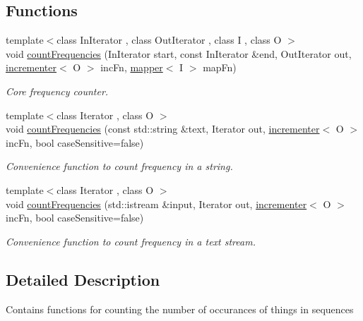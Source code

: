 \subsection*{Functions}
\begin{DoxyCompactItemize}
\item 
{\footnotesize template$<$class In\+Iterator , class Out\+Iterator , class I , class O $>$ }\\void \hyperlink{namespacefrequency_af3425c17daa62ab96cb41b8e9ceb29a8}{count\+Frequencies} (In\+Iterator start, const In\+Iterator \&end, Out\+Iterator out, \hyperlink{namespacefrequency_af87bfdb87aeaf4b03b24c0632e9f0285}{incrementer}$<$ O $>$ inc\+Fn, \hyperlink{namespacefrequency_aa17c006bff1dce09290290eb7e5e6acf}{mapper}$<$ I $>$ map\+Fn)
\begin{DoxyCompactList}\small\item\em Core frequency counter. \end{DoxyCompactList}\item 
{\footnotesize template$<$class Iterator , class O $>$ }\\void \hyperlink{namespacefrequency_a76ebc4c0b0090363b539d17adf40d57d}{count\+Frequencies} (const std\+::string \&text, Iterator out, \hyperlink{namespacefrequency_af87bfdb87aeaf4b03b24c0632e9f0285}{incrementer}$<$ O $>$ inc\+Fn, bool case\+Sensitive=false)
\begin{DoxyCompactList}\small\item\em Convenience function to count frequency in a string. \end{DoxyCompactList}\item 
{\footnotesize template$<$class Iterator , class O $>$ }\\void \hyperlink{namespacefrequency_ad4f50d5d37b4053cc8cc18c1efe59ddb}{count\+Frequencies} (std\+::istream \&input, Iterator out, \hyperlink{namespacefrequency_af87bfdb87aeaf4b03b24c0632e9f0285}{incrementer}$<$ O $>$ inc\+Fn, bool case\+Sensitive=false)
\begin{DoxyCompactList}\small\item\em Convenience function to count frequency in a text stream. \end{DoxyCompactList}\end{DoxyCompactItemize}


\subsection{Detailed Description}
Contains functions for counting the number of occurances of things in sequences 

